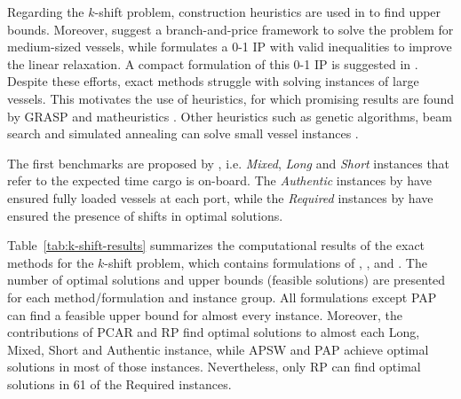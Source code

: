 \documentclass[preprint,12pt,authoryear]{elsarticle}
\begin{document}
Regarding the $k$-shift problem, construction heuristics are used in \cite{Avriel1998StowageShifts, Ding2015StowageShifts} to find upper bounds. Moreover, \cite{Roberti2018APlans} suggest a branch-and-price framework to solve the problem for medium-sized vessels, while \cite{Parreno-Torres2019SolutionProblem} formulates a 0-1 IP with valid inequalities to improve the linear relaxation. A compact formulation of this 0-1 IP is suggested in \cite{Parreno-Torres2020ImprovingProblems, Parreno-Torres2021SolvingAlgorithm}.
Despite these efforts, exact methods struggle with solving instances of large vessels. This motivates the use of heuristics, for which promising results are found by GRASP and matheuristics \citep{Parreno-Torres2019SolutionProblem, Parreno-Torres2020ImprovingProblems, Parreno-Torres2021SolvingAlgorithm}. Other heuristics such as genetic algorithms, beam search and simulated annealing can solve small vessel instances \citep{Dubrovsky2002AProblem, Azevedo2014SolvingMeta-heuristics, Azevedo2018SolvingAlgorithm}.

The first benchmarks are proposed by \cite{Avriel1998StowageShifts}, i.e. {\em Mixed}, {\em Long} and {\em Short} instances that refer to the expected time cargo is on-board. The {\em Authentic} instances by \cite{Ding2015StowageShifts} have ensured fully loaded vessels at each port, while the {\em Required} instances by \cite{Roberti2018APlans} have ensured the presence of shifts in optimal solutions. 

Table~\ref{tab:k-shift-results} summarizes the computational results of the exact methods for the $k$-shift problem, which contains formulations of \cite{Avriel1998StowageShifts}, \cite{Roberti2018APlans}, \cite{Parreno-Torres2019SolutionProblem} and \cite{Parreno-Torres2021SolvingAlgorithm}. The number of optimal solutions and upper bounds (feasible solutions) are presented for each method/formulation and instance group. All formulations except PAP can find a feasible upper bound for almost every instance. Moreover, the contributions of PCAR and RP find optimal solutions to almost each Long, Mixed, Short and Authentic instance, while APSW and PAP achieve optimal solutions in most of those instances. Nevertheless, only RP can find optimal solutions in 61 of the Required instances.
\end{document}
